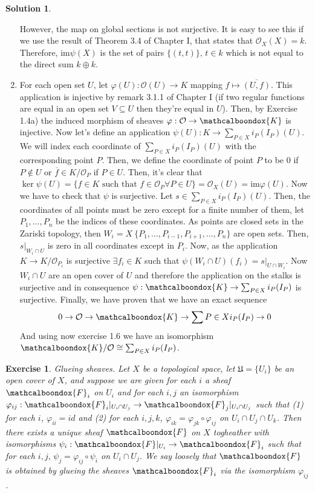 \documentclass[12pt]{article}
\newcommand{\ima}{\ensuremath{\mathrm{im}}}
\newcommand{\locO}{\ensuremath{\mathcal{O}}}
\newtheorem{ex}{Exercise}[section]
\theoremstyle{definition}
\newtheorem*{sol}{Solution}
\newcommand{\sF}{\ensuremath{\mathcalboondox{F}}}
\begin{document}
\begin{sol}
\begin{enumerate}[label = \alph*)]
		However, the map on global sections is not surjective. It is easy to see this if we use the result of Theorem 3.4 of Chapter I, that states that $\locO_X(X) = k$. Therefore, $\ima \psi(X)$ is the set of pairs $\{(t,t)\}, \, t \in k$ which is not equal to the direct sum $k \oplus k$.

		\item For each open set $U$, let $\varphi(U): \locO(U) \to K$ mapping $f \mapsto \overline{(U,f)}$. This application is injective by remark 3.1.1 of Chapter I (if two regular functions are equal in an open set $V \subseteq U$ then they're equal in $U$). Then, by Exercise 1.4a) the induced morphism of sheaves $\varphi: \locO \to \mathcalboondox{K}$ is injective. Now let's define an application $\psi(U): K \to \sum_{P \in X} i_P(I_P)(U)$. We will index each coordinate of $\sum_{P \in X} i_P(I_P)(U)$ with the corresponding point $P$. Then, we define the coordinate of point $P$ to be 0 if $P \notin U$ or $\overline{f} \in K/\locO_P$ if $P \in U$. Then, it's clear that $\ker \psi(U) = \{f \in K \text{ such that } f \in \locO_P \forall P \in U\} = \locO_X(U)= \ima \varphi(U)$. Now we have to check that $\psi$ is surjective. Let $s \in \sum_{P \in X} i_P(I_P) (U)$. Then, the coordinates of all points must be zero except for a finite number of them, let $P_1, \dots, P_n$ be the indices of these coordinates. As points are closed sets in the Zariski topology, then $W_i = X \ \{P_1, \dots, P_{i-1}, P_{i+1}, \dots, P_n \}$ are open sets. Then, $s|_{W_i \cap U}$ is zero in all coordinates except in $P_i$. Now, as the application $K \to K/\locO_{P_i}$ is surjective $\exists f_i \in K$ such that $\psi(W_i \cap U)(f_i) = s|_{U \cap W_i}$. Now $W_i \cap U$ are an open cover of $U$ and therefore the application on the stalks is surjective and in consequence $\psi: \mathcalboondox{K} \to \sum_{P \in X} i_P(I_P)$ is surjective. Finally, we have proven that we have an exact sequence 
		\[
			0 \to \locO \to \mathcalboondox{K} \to \sum{P \in X}i_P(I_P) \to 0
		\]
		And using now exercise 1.6 we have an isomorphism $\mathcalboondox{K}/\locO \cong \sum_{P \in X}i_P(I_P)$.

	\end{enumerate}
\end{sol}

\begin{ex}
	Glueing sheaves. Let $X$ be a topological space, let $\mathfrak{U} = \{U_i\}$ be an open cover of $X$, and suppose we are given for each $i$ a sheaf $\sF_i$ on $U_i$ and for each $i,j$ an isomorphism $\varphi_{ij}: \sF_i|_{U_i \cap U_j} \to \sF_j|_{U_i \cap U_j}$ such that (1) for each $i$, $\varphi_{ii} = id$ and (2) for each $i,j,k$, $\varphi_{ik} = \varphi_{jk} \circ \varphi_{ij}$ on $U_i \cap U_j \cap U_k$. Then there exists a unique sheaf $\sF$ on $X$ togheather with isomorphisms $\psi_i: \sF|_{U_i} \to \sF_i$ such that for each $i,j, \, \psi_j = \varphi_{ij} \circ \psi_i$ on $U_i \cap U_j$. We say loosely that $\sF$ is obtained by glueing the sheaves $\sF_i$ via the isomorphism $\varphi_{ij}$.
\end{ex}
\end{document}
